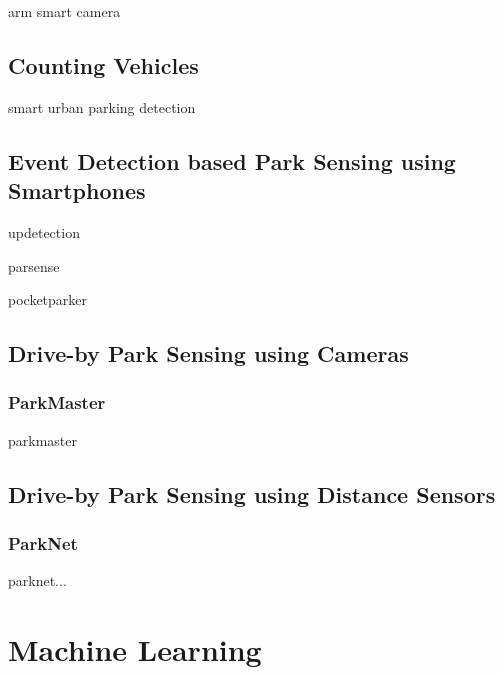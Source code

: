 arm smart camera \cite{stationary_camera_sensing_arm_smart_camera}

\subsection{Counting Vehicles}
\label{sec:counting_in_out_park_sensing}
smart urban parking detection \cite{smarturbanparkingdetection}

\subsection{Event Detection based Park Sensing using Smartphones}
\label{sec:event_detection_park_sensing}

updetection\cite{Ma:2014:USP:2674918.2674929}

parsense \cite{Nawaz:2013:PSB:2500423.2500438}

pocketparker \cite{Nandugudi:2014:PPP:2632048.2632098}

\subsection{Drive-by Park Sensing using Cameras}
\label{sec:related_driveby_park_sensing_cameras}

\subsubsection{ParkMaster}
 
parkmaster \cite{Grassi:2017:PIE:3132211.3134452}


\subsection{Drive-by Park Sensing using Distance Sensors}
\label{sec:related_driveby_park_sensing_distance}

\subsubsection{ParkNet}
\label{sec:parknet}

parknet... \cite{Mathur:2010:PDS:1814433.1814448}







\section{Machine Learning}


